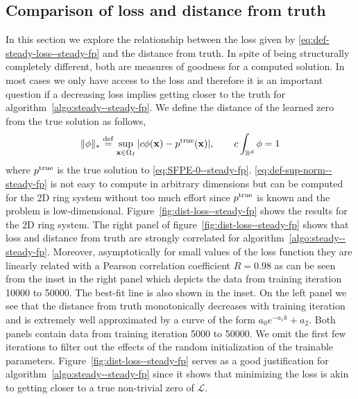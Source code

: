 \subsection{Comparison of loss and distance from truth} In this section we explore the relationship between the loss given by \eqref{eq:def-steady-loss--steady-fp} and the distance from truth. In spite of being structurally completely different, both are measures of goodness for a computed solution. In most cases we only have access to the loss and therefore it is an important question if a decreasing loss implies getting closer to the truth for algorithm~\ref{algo:steady--steady-fp}. We define the distance of the learned zero from the true solution as follows,
\begin{align}
    \|\phi\|_*\stackrel{\rm def}{=}\sup_{\mathbf x\in\Omega_I} |c\phi(\mathbf x) - p^{\rm true}(\mathbf x)|\label{eq:def-sup-norm--steady-fp}, \qquad c\int_{\mathbb R^d}\phi=1
\end{align}
where $p^{\rm true}$ is the true solution to \eqref{eq:SFPE-0--steady-fp}. \eqref{eq:def-sup-norm--steady-fp} is not easy to compute in arbitrary dimensions but can be computed for the 2D ring system without too much effort since $p^{\rm true}$ is known and the problem is low-dimensional. Figure~\ref{fig:dist-loss--steady-fp} shows the results for the 2D ring system. The right panel of figure~\ref{fig:dist-loss--steady-fp} shows that loss and distance from truth are strongly correlated for algorithm~\ref{algo:steady--steady-fp}. Moreover, asymptotically for small values of the loss function they are linearly related with a Pearson correlation coefficient $R=0.98$ as can be seen from the inset in the right panel which depicts the data from training iteration 10000 to 50000. The best-fit line is also shown in the inset. On the left panel we see that the distance from truth monotonically decreases with training iteration and is extremely well approximated by a curve of the form $a_0e^{-a_1k}+a_2$. Both panels contain data from training iteration 5000 to 50000. We omit the first few iterations to filter out the effects of the random initialization of the trainable parameters. Figure~\ref{fig:dist-loss--steady-fp} serves as a good justification for algorithm~\ref{algo:steady--steady-fp} since it shows that minimizing the loss is akin to getting closer to a true non-trivial zero of $\mathcal L$.
 
